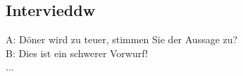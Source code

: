 \subsection{Intervieddw}
\label{sec:detail-a1}

A: Döner wird zu teuer, stimmen Sie der Aussage zu?\\
B: Dies ist ein schwerer Vorwurf!\\
...
